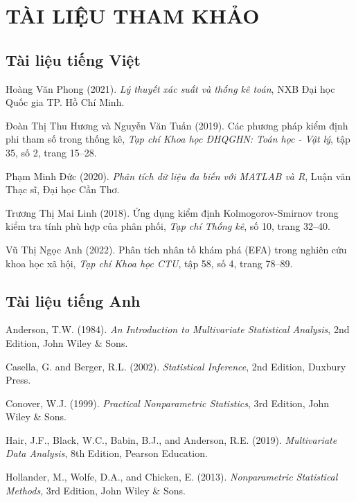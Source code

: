 \chapter*{TÀI LIỆU THAM KHẢO}

\begin{thebibliography}{99}

\section*{Tài liệu tiếng Việt}

 Hoàng Văn Phong (2021). \textit{Lý thuyết xác suất và thống kê toán}, NXB Đại học Quốc gia TP. Hồ Chí Minh.

 Đoàn Thị Thu Hương và Nguyễn Văn Tuấn (2019). Các phương pháp kiểm định phi tham số trong thống kê, \textit{Tạp chí Khoa học ĐHQGHN: Toán học - Vật lý}, tập 35, số 2, trang 15--28.

 Phạm Minh Đức (2020). \textit{Phân tích dữ liệu đa biến với MATLAB và R}, Luận văn Thạc sĩ, Đại học Cần Thơ.

 Trương Thị Mai Linh (2018). Ứng dụng kiểm định Kolmogorov-Smirnov trong kiểm tra tính phù hợp của phân phối, \textit{Tạp chí Thống kê}, số 10, trang 32--40.

 Vũ Thị Ngọc Anh (2022). Phân tích nhân tố khám phá (EFA) trong nghiên cứu khoa học xã hội, \textit{Tạp chí Khoa học CTU}, tập 58, số 4, trang 78--89.

\section*{Tài liệu tiếng Anh}

 Anderson, T.W. (1984). \textit{An Introduction to Multivariate Statistical Analysis}, 2nd Edition, John Wiley \& Sons.

 Casella, G. and Berger, R.L. (2002). \textit{Statistical Inference}, 2nd Edition, Duxbury Press.

 Conover, W.J. (1999). \textit{Practical Nonparametric Statistics}, 3rd Edition, John Wiley \& Sons.

 Hair, J.F., Black, W.C., Babin, B.J., and Anderson, R.E. (2019). \textit{Multivariate Data Analysis}, 8th Edition, Pearson Education.

 Hollander, M., Wolfe, D.A., and Chicken, E. (2013). \textit{Nonparametric Statistical Methods}, 3rd Edition, John Wiley \& Sons.


\end{thebibliography}

